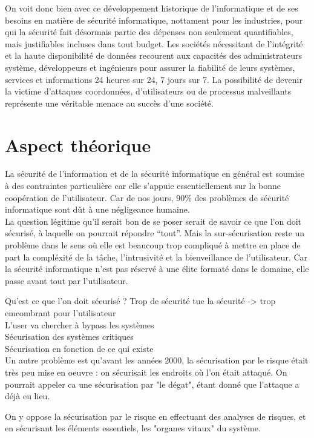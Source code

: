 \documentclass[a4paper]{memoir}
\begin{document}
On voit donc bien avec ce développement historique de l'informatique et de ses besoins en matière de sécurité informatique, nottament pour les industries, pour qui la sécurité fait désormais partie des dépenses non seulement quantifiables, mais justifiables incluses dans tout budget. Les sociétés nécessitant de l'intégrité et la haute disponibilité de données recourent aux capacités des administrateurs système, développeurs et ingénieurs pour assurer la fiabilité de leurs systèmes, services et informations 24 heures sur 24, 7 jours sur 7. La possibilité de devenir la victime d'attaques coordonnées, d'utilisateurs ou de processus malveillants représente une véritable menace au succès d'une société. 

\chapter{Aspect théorique}
 

La sécurité de l'information et de la sécurité informatique en général est soumise à des contraintes particulière car elle s'appuie essentiellement sur la bonne coopération de l'utilisateur. Car de nos jours, 90\% des problèmes de sécurité informatique sont dût à une négligeance humaine.\\
La question légitime qu'il serait bon de se poser serait de savoir ce que l'on doit sécurisé, à laquelle on pourrait répondre ``tout''. Mais la sur-sécurisation reste un problème dans le sens où elle est beaucoup trop compliqué à mettre en place de part la compléxité de la tâche, l'intrusivité et la bienveillance de l'utilisateur. Car la sécurité informatique n'est pas réservé à une élite formaté dans le domaine, elle passe avant tout par l'utilisateur.


Qu'est ce que l'on doit sécurisé ? Trop de sécurité tue la sécurité -> trop emcombrant pour l'utilisateur\\
L'user va chercher à bypass les systèmes\\
Sécurisation des systèmes critiques\\
Sécurisation en fonction de ce qui existe\\ 
    
Un autre problème est qu'avant les années 2000, la sécurisation par le risque était très peu mise en oeuvre : on sécurisait les endroits où l'on était attaqué. On pourrait appeler ca une sécurisation par "le dégat", étant donné que l'attaque a déjà eu lieu.

On y oppose la sécurisation par le risque en effectuant des analyses de risques, et en sécurisant les éléments essentiels, les "organes vitaux" du système.
\end{document}

